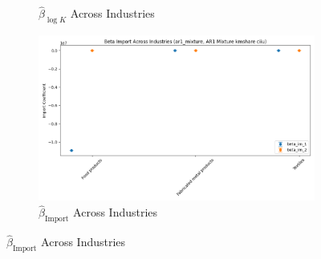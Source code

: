 \documentclass{article}
\begin{document}
\begin{figure}[ht!]
\begin{subfigure}[t]{0.32\textwidth}
        \caption{$\hat{\beta}_{\log K}$ Across Industries}
    \end{subfigure}
    \begin{subfigure}[t]{0.32\textwidth}
        \centering
        \includegraphics[width=\textwidth]{figure/ar1_mixture_kmshare_ciiu_beta_im_across_industries.png}
        \caption{$\hat{\beta}_{\text{Import}}$ Across Industries}
    \end{subfigure}
\end{figure}
\end{document}
